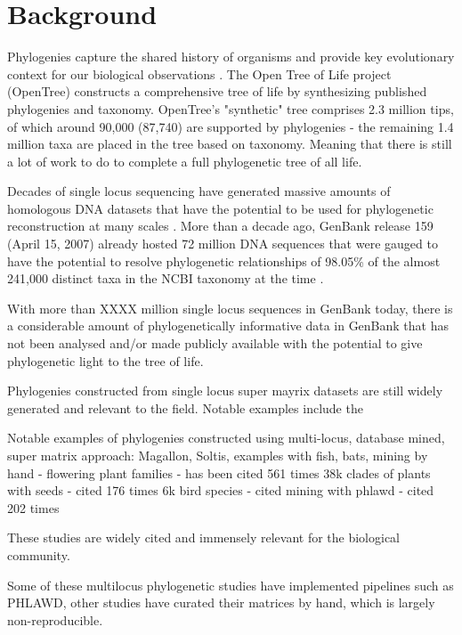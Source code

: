 \documentclass{bmcart}
\begin{document}

\section*{Background}
Phylogenies capture the shared history of organisms and provide key evolutionary
context for our biological observations \cite{dobzhansky1973nothing}.
The Open Tree of Life project (OpenTree)
constructs a comprehensive tree of life by synthesizing published phylogenies
and taxonomy. OpenTree's "synthetic" tree comprises 2.3 million tips, of which
around 90,000 (87,740) are supported by phylogenies - the remaining 1.4 million taxa are
placed in the tree based on taxonomy. Meaning that there is still a lot of work
to do to complete a full phylogenetic tree of all life.

Decades of single locus sequencing have generated
massive amounts of homologous DNA datasets that have the potential to be used for phylogenetic
reconstruction at many scales \cite{sanderson2008phylota}.
More than a decade ago, GenBank release 159 (April 15, 2007) already hosted 72
million DNA sequences that were gauged to have the potential to resolve phylogenetic
relationships of 98.05\% of the almost 241,000
distinct taxa in the NCBI taxonomy at the time \cite{sanderson2008phylota}.

With more than XXXX million single locus
sequences in GenBank today, there is a considerable amount of phylogenetically
informative data in GenBank that has not been analysed and/or made publicly available
with the potential to give phylogenetic light to the tree of life.

Phylogenies constructed from single locus super mayrix datasets are still widely
generated and relevant to the field. Notable examples include the

Notable examples of phylogenies constructed using multi-locus, database mined, super matrix approach:
Magallon, Soltis, examples with fish, bats,
\cite{magallon2015metacalibrated} mining by hand - flowering plant families - has been cited 561 times
\cite{smith2018constructing} 38k clades of plants with seeds - cited 176 times
\cite{jetz2012global} 6k bird species - cited
\cite{rabosky2018inverse} mining with phlawd - cited 202 times

These studies are widely cited and immensely relevant for the biological community.


Some of these multilocus phylogenetic studies have implemented pipelines such as PHLAWD,
other studies have curated their matrices by hand, which is largely non-reproducible.
\end{document}

